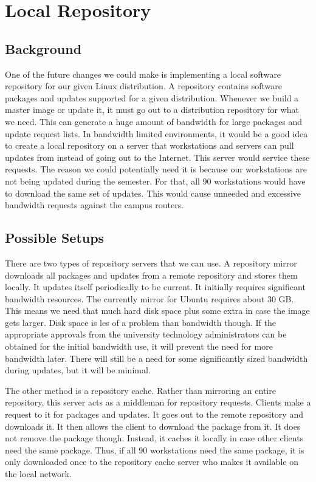 \section{Local Repository}\label{sec:local_repository}
\subsection{Background}
One of the future changes we could make is implementing a local software repository for our given Linux distribution.  A repository contains software packages and updates supported for a given distribution.  Whenever we build a master image or update it, it must go out to a distribution repository for what we need.  This can generate a huge amount of bandwidth for large packages and update request lists.  In bandwidth limited environments, it would be a good idea to create a local repository on a server that workstations and servers can pull updates from instead of going out to the Internet.  This server would service these requests.  The reason we could potentially need it is because our workstations are not being updated during the semester.  For that, all 90 workstations would have to download the same set of updates.  This would cause unneeded and excessive bandwidth requests against the campus routers.  

\subsection{Possible Setups}
There are two types of repository servers that we can use.  A repository mirror downloads all packages and updates from a remote repository and stores them locally.  It updates itself periodically to be current.  It initially requires significant bandwidth resources.  The currently mirror for Ubuntu requires about 30 GB.  This means we need that much hard disk space plus some extra in case the image gets larger.  Disk space is les of a problem than bandwidth though.  If the appropriate approvals from the university technology administrators can be obtained for the initial bandwidth use, it will prevent the need for more bandwidth later.  There will still be a need for some significantly sized bandwidth during updates, but it will be minimal.  

The other method is a repository cache.  Rather than mirroring an entire repository, this server acts as a middleman for repository requests.  Clients make a request to it for packages and updates.  It goes out to the remote repository and downloads it.  It then allows the client to download the package from it.  It does not remove the package though.  Instead, it caches it locally in case other clients need the same package.  Thus, if all 90 workstations need the same package, it is only downloaded once to the repository cache server who makes it available on the local network.  

